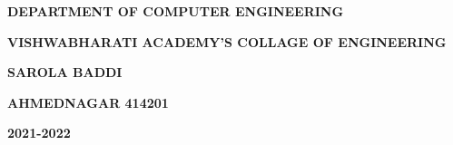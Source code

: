 \documentclass[12pt]{report}
\begin{document}
\begin{center}
\begin{textblock*}
\vspace*{0.2in}
\textbf{\large{DEPARTMENT OF COMPUTER ENGINEERING}}

\vspace*{0.05in}
\textbf{\small{VISHWABHARATI ACADEMY'S COLLAGE OF ENGINEERING}}

\vspace*{0.05in}
\textbf{\small{SAROLA BADDI}}

\vspace*{0.05in}
\textbf{\small{AHMEDNAGAR 414201}}

\vspace*{0.2in}
\textbf{\small{2021-2022}}
   
    \end{textblock*}

\end{center}
\newpage
\vspace{1 cm}
\clearpage\thispagestyle{empty}
\thisfancypage{\setlength{\fboxsep}{10pt}\doublebox}{}
\end{document}

